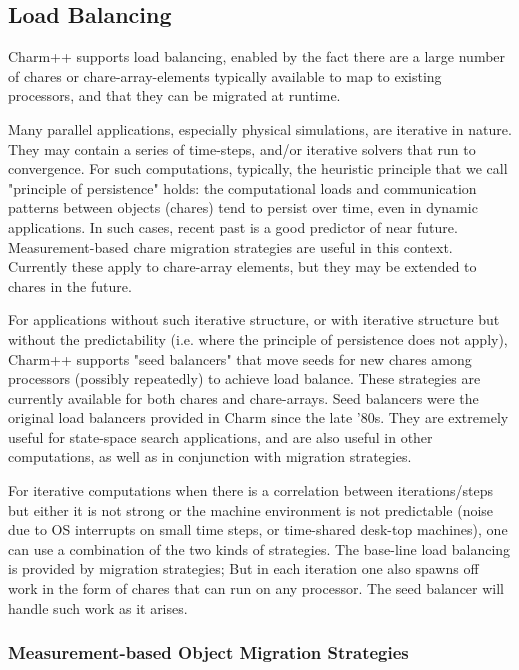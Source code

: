 
\subsection{Load Balancing}

\label{loadbalancing}


Charm++ supports load balancing, enabled by the fact there are a large
number of chares or chare-array-elements typically available to map to
existing processors, and that they can be migrated at runtime.

Many parallel applications, especially physical simulations, are
iterative in nature. They may contain a series of time-steps, and/or
iterative solvers that run to convergence. For such computations,
typically, the heuristic principle that we call "principle of
persistence" holds: the computational loads and communication patterns
between objects (chares) tend to persist over time, even in dynamic
applications. In such cases, recent past is a good predictor of near
future. Measurement-based chare migration strategies are useful in
this context. Currently these apply to chare-array elements, but they
may be extended to chares in the future.

For applications without such iterative structure, or with iterative structure
but without the predictability (i.e. where the principle of persistence does
not apply), Charm++ supports "seed balancers" that move seeds for new chares
among processors (possibly repeatedly) to achieve load balance. These
strategies are currently available for both chares and chare-arrays.  Seed
balancers were the original load balancers provided in Charm since the late
'80s. They are extremely useful for state-space search applications, and are
also useful in other computations, as well as in conjunction with migration
strategies.

For iterative computations when there is a correlation between iterations/steps
but either it is not strong or the machine environment is not predictable
(noise due to OS interrupts on small time steps, or time-shared desk-top
machines), one can use a combination of the two kinds of strategies. The
base-line load balancing is provided by migration strategies; But in each
iteration one also spawns off work in the form of chares that can run on any
processor. The seed balancer will handle such work as it arises.

\subsubsection{Measurement-based Object Migration Strategies}

